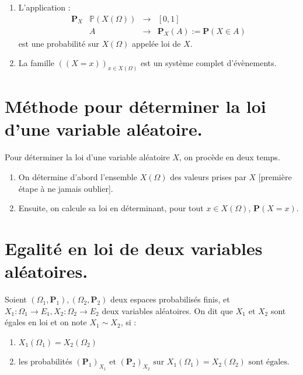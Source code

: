 \documentclass{article}
\begin{document}
\begin{enumerate}[label=(\alph*)]
    \item L'application : 
    \[
        \begin{array}{c|ccc}
            \mathbf{P}_X & \mathbb{P}(X(\Omega)) & \longrightarrow & [0,1]
            \\[0.3em]
                         & A                     & \longrightarrow & \mathbf{P}_X(A) := \mathbf{P}(X \in A)
        \end{array}
    \]
    est une probabilité sur $X(\Omega)$ appelée loi de $X$.
    \item La famille $((X = x))_{x \in X(\Omega)}$ est un système complet d'évènements.
\end{enumerate}

\section{Méthode pour déterminer la loi d'une variable aléatoire.}

Pour déterminer la loi d'une variable aléatoire $X$, on procède en deux temps.
\begin{enumerate}[label=(\alph*)]
    \item On détermine d'abord l'ensemble $X(\Omega)$ des valeurs prises par $X$ [première étape à ne jamais oublier].
    \item Ensuite, on calcule sa loi en déterminant, pour tout $x \in X(\Omega)$, $\mathbf{P}(X = x)$.
\end{enumerate}

\section{Egalité en loi de deux variables aléatoires.}

Soient $(\Omega_1, \mathbf{P}_1), (\Omega_2, \mathbf{P}_2)$ deux espaces probabilisés finis, et $X_1 : \Omega_1 \longrightarrow E_1, X_2 : \Omega_2 \longrightarrow E_2$ deux variables aléatoires. On dit que $X_1 \text{ et } X_2$ sont égales en loi et on note $X_1 \sim X_2$, si :
\begin{enumerate}[label=(\alph*)]
    \item $X_1(\Omega_1) = X_2(\Omega_2)$
    \item les probabilités $(\mathbf{P}_1)_{X_1} \text{ et } (\mathbf{P}_2)_{X_2} \text{ sur } X_1(\Omega_1) = X_2(\Omega_2) \text{ sont égales.}$ 
\end{enumerate}
\end{document}
